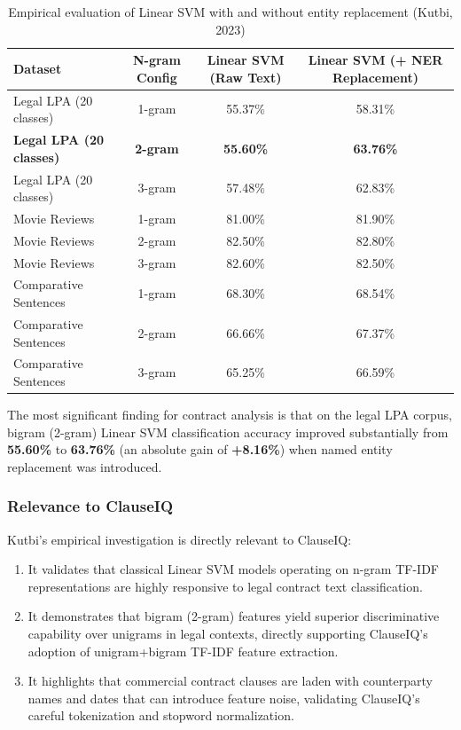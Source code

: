 \begin{table}[h!]
\centering
\small
\begin{tabular}{lccc}
\toprule
\textbf{Dataset} & \textbf{N-gram Config} & \textbf{Linear SVM (Raw Text)} & \textbf{Linear SVM (+ NER Replacement)} \\
\midrule
Legal LPA (20 classes) & 1-gram & 55.37\% & 58.31\% \\
\textbf{Legal LPA (20 classes)} & \textbf{2-gram} & \textbf{55.60\%} & \textbf{63.76\%} \\
Legal LPA (20 classes) & 3-gram & 57.48\% & 62.83\% \\
\midrule
Movie Reviews & 1-gram & 81.00\% & 81.90\% \\
Movie Reviews & 2-gram & 82.50\% & 82.80\% \\
Movie Reviews & 3-gram & 82.60\% & 82.50\% \\
\midrule
Comparative Sentences & 1-gram & 68.30\% & 68.54\% \\
Comparative Sentences & 2-gram & 66.66\% & 67.37\% \\
Comparative Sentences & 3-gram & 65.25\% & 66.59\% \\
\bottomrule
\end{tabular}
\caption{Empirical evaluation of Linear SVM with and without entity replacement (Kutbi, 2023)}
\label{tab:kutbi_results}
\end{table}

The most significant finding for contract analysis is that on the legal LPA corpus, bigram (2-gram) Linear SVM classification accuracy improved substantially from \textbf{55.60\%} to \textbf{63.76\%} (an absolute gain of \textbf{+8.16\%}) when named entity replacement was introduced.

\subsubsection*{Relevance to ClauseIQ}
Kutbi's empirical investigation is directly relevant to ClauseIQ:
\begin{enumerate}
    \item It validates that classical Linear SVM models operating on n-gram TF-IDF representations are highly responsive to legal contract text classification.
    \item It demonstrates that bigram (2-gram) features yield superior discriminative capability over unigrams in legal contexts, directly supporting ClauseIQ's adoption of unigram+bigram TF-IDF feature extraction.
    \item It highlights that commercial contract clauses are laden with counterparty names and dates that can introduce feature noise, validating ClauseIQ's careful tokenization and stopword normalization.
\end{enumerate}

